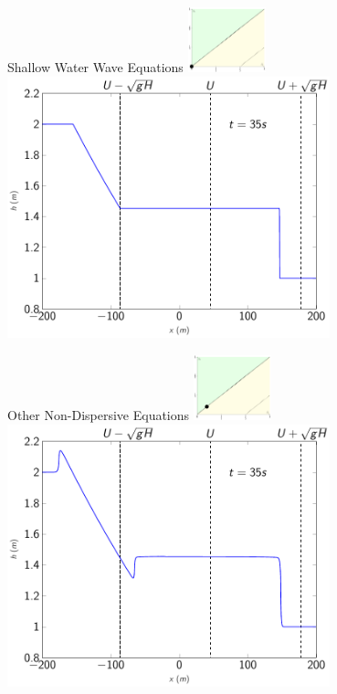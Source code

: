 \documentclass[pdf]{beamer}
\begin{document}
\begin{frame}{Shallow Water Wave Equations \hfill \includegraphics[width=0.17\textwidth]{./Pics/Tex/Explanatory/RegionsPlot/SPSWWE.pdf}}
\centering
\includegraphics[width=0.7\textwidth]{./Pics/Tex/Results/DB/SWWE/RegionSWWE.pdf}
\end{frame}


\begin{frame}{Other Non-Dispersive Equations \hfill \includegraphics[width=0.17\textwidth]{./Pics/Tex/Explanatory/RegionsPlot/SPrSV.pdf}}
\centering
\includegraphics[width=0.7\textwidth]{./Pics/Tex/Results/DB/rSV/RegionrSV.pdf}
\end{frame}
\end{document}
